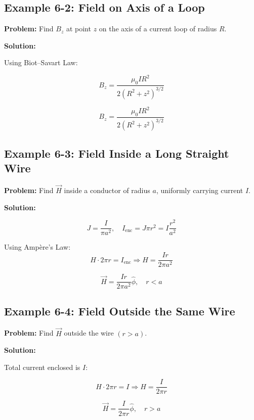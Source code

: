 \documentclass[12pt]{article}
\begin{document}
\subsection*{Example 6-2: Field on Axis of a Loop}

\textbf{Problem:}  
Find \( B_z \) at point \( z \) on the axis of a current loop of radius \( R \).

\textbf{Solution:}

Using Biot–Savart Law:

\[
B_z = \frac{\mu_0 I R^2}{2 (R^2 + z^2)^{3/2}}
\]

\begin{tcolorbox}
\[
\boxed{B_z = \frac{\mu_0 I R^2}{2 (R^2 + z^2)^{3/2}}}
\]
\end{tcolorbox}

\subsection*{Example 6-3: Field Inside a Long Straight Wire}

\textbf{Problem:}  
Find \( \vec{H} \) inside a conductor of radius \( a \), uniformly carrying current \( I \).

\textbf{Solution:}

\[
J = \frac{I}{\pi a^2}, \quad I_{\text{enc}} = J \pi r^2 = I \frac{r^2}{a^2}
\]

Using Ampère’s Law:
\[
H \cdot 2\pi r = I_{\text{enc}} \Rightarrow H = \frac{I r}{2\pi a^2}
\]

\begin{tcolorbox}
\[
\boxed{\vec{H} = \frac{I r}{2\pi a^2} \hat{\phi}}, \quad r < a
\]
\end{tcolorbox}

\subsection*{Example 6-4: Field Outside the Same Wire}

\textbf{Problem:}  
Find \( \vec{H} \) outside the wire \( (r > a) \).

\textbf{Solution:}

Total current enclosed is \( I \):

\[
H \cdot 2\pi r = I \Rightarrow H = \frac{I}{2\pi r}
\]

\begin{tcolorbox}
\[
\boxed{\vec{H} = \frac{I}{2\pi r} \hat{\phi}}, \quad r > a
\]
\end{tcolorbox}
\end{document}
